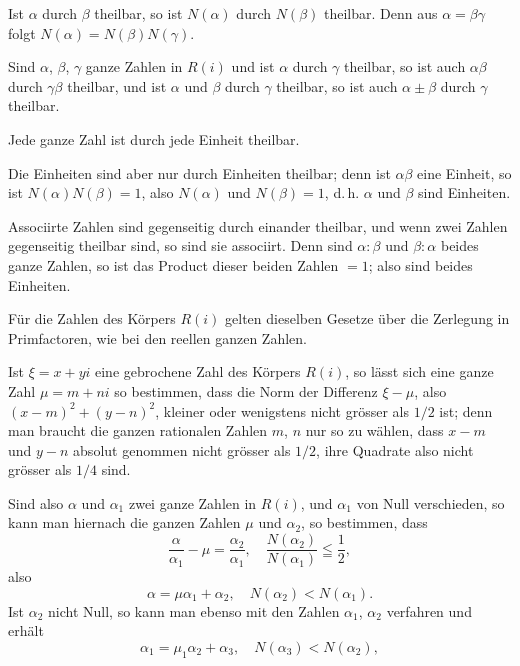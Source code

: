 
Ist $\alpha$ durch $\beta$ theilbar, so ist $N(\alpha)$ durch $N(\beta)$ theilbar.
Denn aus $\alpha=\beta\gamma$ folgt $N(\alpha)=N(\beta)N(\gamma)$.

Sind $\alpha$, $\beta$, $\gamma$ ganze Zahlen in $R(i)$ und ist $\alpha$ durch $\gamma$ theilbar,
so ist auch $\alpha\beta$ durch $\gamma\beta$ theilbar, und ist $\alpha$ und $\beta$ durch $\gamma$
theilbar, so ist auch $\alpha\pm\beta$ durch $\gamma$ theilbar.

Jede ganze Zahl ist durch jede Einheit theilbar.

Die Einheiten sind aber nur durch Einheiten theilbar; denn
ist $\alpha\beta$ eine Einheit, so ist $N(\alpha)N(\beta)=1$, also $N(\alpha)$ und
$N(\beta)=1$, d.\,h. $\alpha$ und $\beta$ sind Einheiten.

Associirte Zahlen sind gegenseitig durch einander theilbar,
und wenn zwei Zahlen gegenseitig theilbar sind, so sind sie
associirt. Denn sind $\alpha:\beta$ und $\beta:\alpha$ beides ganze Zahlen, so ist
das Product dieser beiden Zahlen $=1$; also sind beides Einheiten.

Für die Zahlen des Körpers $R(i)$ gelten dieselben
Gesetze über die Zerlegung in Primfactoren, wie bei den reellen
ganzen Zahlen.



Ist $\xi=x+yi$ eine gebrochene Zahl des Körpers $R(i)$, so
lässt sich eine ganze Zahl $\mu=m+ni$ so bestimmen, dass die
Norm der Differenz $\xi-\mu$, also $(x-m)^2+(y-n)^2$, kleiner
oder wenigstens nicht grösser als $1/2$ ist; denn man braucht die
ganzen rationalen Zahlen $m$, $n$ nur so zu wählen, dass $x-m$
und $y-n$ absolut genommen nicht grösser als $1/2$, ihre Quadrate
also nicht grösser als $1/4$ sind.

Sind also $\alpha$ und $\alpha_1$ zwei ganze Zahlen in $R(i)$, und $\alpha_1$ von
Null verschieden, so kann man hiernach die ganzen Zahlen $\mu$
und $\alpha_2$, so bestimmen, dass
\[
\frac{\alpha}{\alpha_1}-\mu=\frac{\alpha_2}{\alpha_1},\quad \frac{N(\alpha_2)}{N(\alpha_1)}\leqq \frac{1}{2},
\]
also
\[
\alpha=\mu\alpha_1+\alpha_2,\quad N(\alpha_2)<N(\alpha_1).
\]
Ist $\alpha_2$ nicht Null, so kann man ebenso mit den Zahlen
$\alpha_1$, $\alpha_2$ verfahren und erhält
\[
\alpha_1=\mu_1\alpha_2+\alpha_3,\quad N(\alpha_3)<N(\alpha_2),
\]
